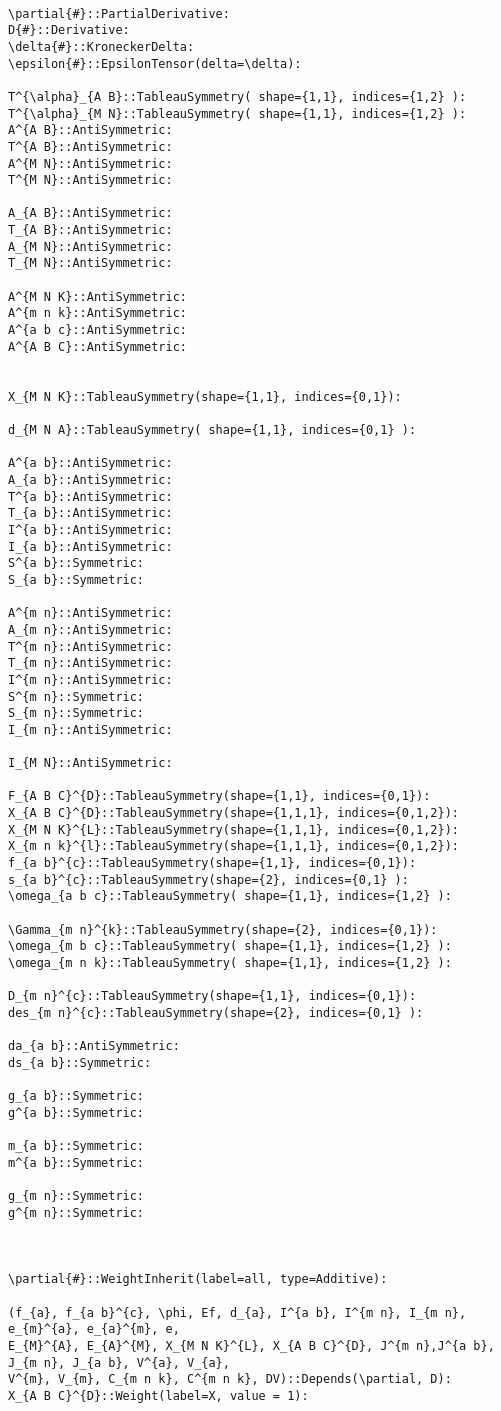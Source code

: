 \documentclass[11pt]{article}
\begin{document}
\\
{\color[named]{Blue}\begin{verbatim}
\partial{#}::PartialDerivative:
D{#}::Derivative:
\delta{#}::KroneckerDelta:
\epsilon{#}::EpsilonTensor(delta=\delta):

T^{\alpha}_{A B}::TableauSymmetry( shape={1,1}, indices={1,2} ):
T^{\alpha}_{M N}::TableauSymmetry( shape={1,1}, indices={1,2} ):
A^{A B}::AntiSymmetric:
T^{A B}::AntiSymmetric:
A^{M N}::AntiSymmetric:
T^{M N}::AntiSymmetric:

A_{A B}::AntiSymmetric:
T_{A B}::AntiSymmetric:
A_{M N}::AntiSymmetric:
T_{M N}::AntiSymmetric:

A^{M N K}::AntiSymmetric:
A^{m n k}::AntiSymmetric:
A^{a b c}::AntiSymmetric:
A^{A B C}::AntiSymmetric:


X_{M N K}::TableauSymmetry(shape={1,1}, indices={0,1}):

d_{M N A}::TableauSymmetry( shape={1,1}, indices={0,1} ):

A^{a b}::AntiSymmetric:
A_{a b}::AntiSymmetric:
T^{a b}::AntiSymmetric:
T_{a b}::AntiSymmetric:
I^{a b}::AntiSymmetric:
I_{a b}::AntiSymmetric:
S^{a b}::Symmetric:
S_{a b}::Symmetric:

A^{m n}::AntiSymmetric:
A_{m n}::AntiSymmetric:
T^{m n}::AntiSymmetric:
T_{m n}::AntiSymmetric:
I^{m n}::AntiSymmetric:
S^{m n}::Symmetric:
S_{m n}::Symmetric:
I_{m n}::AntiSymmetric:

I_{M N}::AntiSymmetric:

F_{A B C}^{D}::TableauSymmetry(shape={1,1}, indices={0,1}):
X_{A B C}^{D}::TableauSymmetry(shape={1,1,1}, indices={0,1,2}):
X_{M N K}^{L}::TableauSymmetry(shape={1,1,1}, indices={0,1,2}):
X_{m n k}^{l}::TableauSymmetry(shape={1,1,1}, indices={0,1,2}):
f_{a b}^{c}::TableauSymmetry(shape={1,1}, indices={0,1}):
s_{a b}^{c}::TableauSymmetry(shape={2}, indices={0,1} ):
\omega_{a b c}::TableauSymmetry( shape={1,1}, indices={1,2} ):

\Gamma_{m n}^{k}::TableauSymmetry(shape={2}, indices={0,1}):
\omega_{m b c}::TableauSymmetry( shape={1,1}, indices={1,2} ):
\omega_{m n k}::TableauSymmetry( shape={1,1}, indices={1,2} ):

D_{m n}^{c}::TableauSymmetry(shape={1,1}, indices={0,1}):
des_{m n}^{c}::TableauSymmetry(shape={2}, indices={0,1} ):

da_{a b}::AntiSymmetric:
ds_{a b}::Symmetric:

g_{a b}::Symmetric:
g^{a b}::Symmetric:

m_{a b}::Symmetric:
m^{a b}::Symmetric:

g_{m n}::Symmetric:
g^{m n}::Symmetric:



\partial{#}::WeightInherit(label=all, type=Additive):

(f_{a}, f_{a b}^{c}, \phi, Ef, d_{a}, I^{a b}, I^{m n}, I_{m n}, e_{m}^{a}, e_{a}^{m}, e, 
E_{M}^{A}, E_{A}^{M}, X_{M N K}^{L}, X_{A B C}^{D}, J^{m n},J^{a b}, J_{m n}, J_{a b}, V^{a}, V_{a},
V^{m}, V_{m}, C_{m n k}, C^{m n k}, DV)::Depends(\partial, D):
X_{A B C}^{D}::Weight(label=X, value = 1):
\end{verbatim}}
\end{document}
